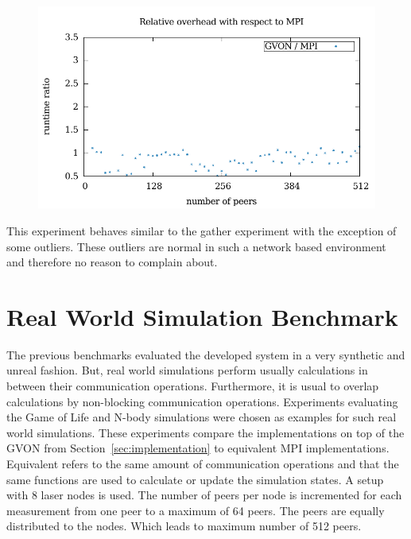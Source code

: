 \begin{figure}[H]
\begin{minipage}[t]{0.5\textwidth}
    \includegraphics[width=\textwidth]{plots/50_reduce_network_overhead_gvon_laser}
  \end{minipage}%
  \caption{ }
  \label{fig:reduce_laser}
\end{figure}

\noindent This experiment behaves similar to the gather experiment with the
exception of some outliers. These outliers are normal in such a
network based environment and therefore no reason to complain about.


\section{Real World Simulation Benchmark}
\label{sec:eval:real}
The previous benchmarks evaluated the developed system in a very
synthetic and unreal fashion. But, real world simulations perform
usually calculations in between their communication
operations. Furthermore, it is usual to overlap calculations by
non-blocking communication operations. Experiments evaluating the Game
of Life and N-body simulations were chosen as examples for such real
world simulations. These experiments compare the implementations on
top of the GVON from Section~\ref{sec:implementation} to equivalent
MPI implementations.  Equivalent refers to the same amount of
communication operations and that the same functions are used to
calculate or update the simulation states. A setup with 8 laser nodes
is used. The number of peers per node is incremented for each
measurement from one peer to a maximum of 64 peers. The peers are
equally distributed to the nodes.  Which leads to maximum number of
512 peers.


